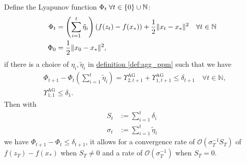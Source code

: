 \documentclass[12pt]{article}
\begin{document}
        \begin{theorem}
        \label{thm:generic_ag_convergence}
            Define the Lyapunov function $\Phi_t\; \forall t \in \{0\}\cup \mathbb N$: 
            \begin{align*}
                \Phi_t &= \left(
                    \sum_{i = 1}^{t} \tilde\eta_{i}
                \right) (f(z_t) - f(x_*)) + \frac{1}{2}\Vert x_t - x_*\Vert^2 \quad \forall t \in \mathbb N
                \\
                \Phi_0 &= \frac{1}{2}\Vert x_0 - x_*\Vert^2, 
            \end{align*}
            if there is a choice of $\eta_i, \tilde \eta_i$ in \hyperref[def:agg_ppm]{definition \ref*{def:agg_ppm}} such that we have 
            \begin{align*}
                & \Phi_{t + 1} - \Phi_{t}\left(
                    \sum_{i = 1}^{t} \tilde \eta_i
                \right) =
                \Upsilon_{2, t + 1}^{\text{AG}} + 
                \Upsilon_{1, t + 1}^{\text{AG}} 
                \le \delta_{t + 1} \quad 
                \forall t \in \mathbb N, 
                \\
                & \Upsilon_{1, 1}^{\text{AG}} \le \delta_1. 
            \end{align*}
            Then with
            \begin{align*}
                S_t &:= \sum_{i = 1}^{t} \delta_i
                \\
                \sigma_t &:= \sum_{i = 1}^{t}\tilde \eta_i
            \end{align*}
            we have $\Phi_{t + 1} - \Phi_t \le \delta_{t + 1}$, it allows for a convergence rate of $\mathcal O \left(\sigma_T^{-1}S_T\right)$ of $f(z_T) - f(x_*)$ when $S_T \neq 0$ and a rate of $\mathcal O(\sigma_T^{-1})$ when $S_T = 0$. 
        \end{theorem}
\end{document}
